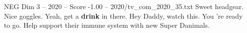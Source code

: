 \begin{textsample}{NEG Dim 3 – 2020 – Score -1.00 – 2020/tv\_com\_2020\_35.txt}  \label{ex:f3_neg_031}
Sweet headgear.
Nice goggles.
Yeah, get a \textbf{drink} in there.
Hey Daddy, watch this.
You 're ready to go.
Help support their immune system with new Super Danimals.

\end{textsample}
